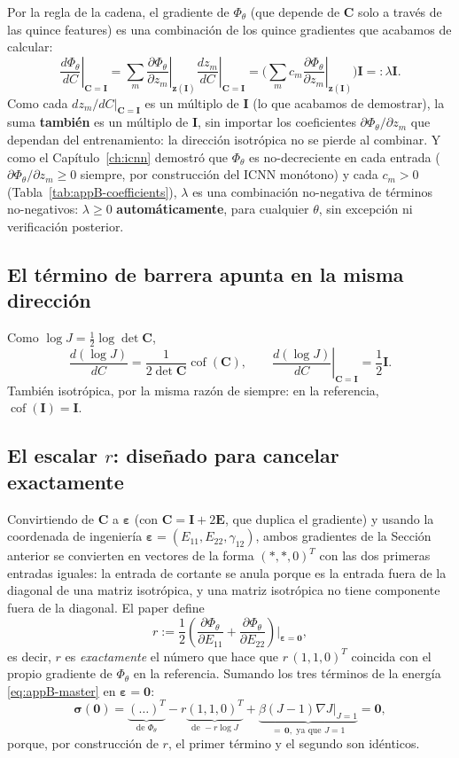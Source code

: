 \documentclass[11pt,a4paper]{article}
\newcommand{\Cof}{\operatorname{cof}}
\begin{document}
Por la regla de la cadena, el gradiente de $\Phi_\theta$ (que depende
de $\bm C$ solo a trav\'es de las quince features) es una combinaci\'on
de los quince gradientes que acabamos de calcular:
\[
 \left.\frac{d\Phi_\theta}{dC}\right|_{\bm C=\bm I}
 =\sum_m\left.\frac{\partial\Phi_\theta}{\partial z_m}\right|_{\bm z(\bm I)}
 \left.\frac{dz_m}{dC}\right|_{\bm C=\bm I}
 =\Big(\sum_mc_m\left.\frac{\partial\Phi_\theta}{\partial z_m}\right|_{\bm z(\bm I)}\Big)\bm I=:\lambda\bm I.
\]
Como cada $dz_m/dC|_{\bm C=\bm I}$ es un m\'ultiplo de $\bm I$ (lo que
acabamos de demostrar), la suma \textbf{tambi\'en} es un m\'ultiplo de
$\bm I$, sin importar los coeficientes $\partial\Phi_\theta/\partial z_m$
que dependan del entrenamiento: la direcci\'on isotr\'opica no se
pierde al combinar. Y como el Cap\'itulo~\ref{ch:icnn} demostr\'o que
$\Phi_\theta$ es no-decreciente en cada entrada
($\partial\Phi_\theta/\partial z_m\geq0$ siempre, por construcci\'on
del ICNN mon\'otono) y cada $c_m>0$ (Tabla~\ref{tab:appB-coefficients}),
$\lambda$ es una combinaci\'on no-negativa de t\'erminos no-negativos:
$\lambda\geq0$ \textbf{autom\'aticamente}, para cualquier $\theta$, sin
excepci\'on ni verificaci\'on posterior.

\subsection{El t\'ermino de barrera apunta en la misma direcci\'on}

Como $\log J=\tfrac12\log\det\bm C$,
\[
 \frac{d(\log J)}{dC}=\frac1{2\det\bm C}\Cof(\bm C),
 \qquad
 \left.\frac{d(\log J)}{dC}\right|_{\bm C=\bm I}=\frac12\bm I.
\]
Tambi\'en isotr\'opica, por la misma raz\'on de siempre: en la
referencia, $\Cof(\bm I)=\bm I$.

\subsection{El escalar $r$: dise\~nado para cancelar exactamente}

Convirtiendo de $\bm C$ a $\bm\varepsilon$ (con $\bm C=\bm I+2\bm E$,
que duplica el gradiente) y usando la coordenada de ingenier\'ia
$\bm\varepsilon=(E_{11},E_{22},\gamma_{12})$, ambos gradientes de la
Secci\'on anterior se convierten en vectores de la forma
$(\ast,\ast,0)^T$ con las dos primeras entradas iguales: la entrada de
cortante se anula porque es la entrada fuera de la diagonal de una
matriz isotr\'opica, y una matriz isotr\'opica no tiene componente
fuera de la diagonal. El paper define
\[
 r:=\frac12\left(\frac{\partial\Phi_\theta}{\partial E_{11}}+\frac{\partial\Phi_\theta}{\partial E_{22}}\right)\bigg|_{\bm\varepsilon=\bm0},
\]
es decir, $r$ es \emph{exactamente} el n\'umero que hace que
$r\,(1,1,0)^T$ coincida con el propio gradiente de $\Phi_\theta$ en la
referencia. Sumando los tres t\'erminos de la energ\'ia
\eqref{eq:appB-master} en $\bm\varepsilon=\bm0$:
\[
 \bm\sigma(\bm0)=\underbrace{(\ldots)^T}_{\text{de }\Phi_\theta}
 -r\underbrace{(1,1,0)^T}_{\text{de }-r\log J}
 +\underbrace{\beta(J-1)\nabla J|_{J=1}}_{=\,\bm0,\text{ ya que }J=1}
 =\bm0,
\]
porque, por construcci\'on de $r$, el primer t\'ermino y el segundo son
id\'enticos.
\end{document}
